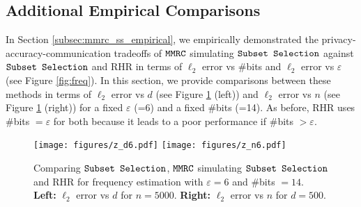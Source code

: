 \subsection{Additional Empirical Comparisons}\label{appendix:mmrc_ss_emp}
In Section \ref{subsec:mmrc_ss_empirical}, we empirically demonstrated the privacy-accuracy-communication tradeoffs of $\texttt{MMRC}$ simulating $\texttt{Subset Selection}$ against $\texttt{Subset Selection}$ and RHR in terms of $\ell_2$ error vs $\#$bits and $\ell_2$ error vs $\varepsilon$ (see Figure \ref{fig:freq}). In this section, we provide comparisons between these methods in terms of $\ell_2$ error vs $d$ (see Figure \ref{fig:freq_app} (left)) and $\ell_2$ error vs $n$ (see Figure \ref{fig:freq_app} (right)) for a fixed $\varepsilon$ (=6) and a fixed $\#$bits (=14). As before, RHR uses $\#$bits $= \varepsilon$ for both because it leads to a poor performance if $\#$bits $ > \varepsilon$.
\begin{figure}[h]
\centering
\texttt{[image: figures/z\_d6.pdf]} \qquad \texttt{[image: figures/z\_n6.pdf]}%
\caption{Comparing $\texttt{Subset Selection}$, $\texttt{MMRC}$ simulating $\texttt{Subset Selection}$ and RHR for frequency estimation with $\varepsilon=6$ and $\#$bits $=14$. \textbf{Left:} $\ell_2$ error vs $d$ for $n = 5000$. \textbf{Right:} $\ell_2$ error vs $n$ for $d = 500$.}
\label{fig:freq_app}
\end{figure}
